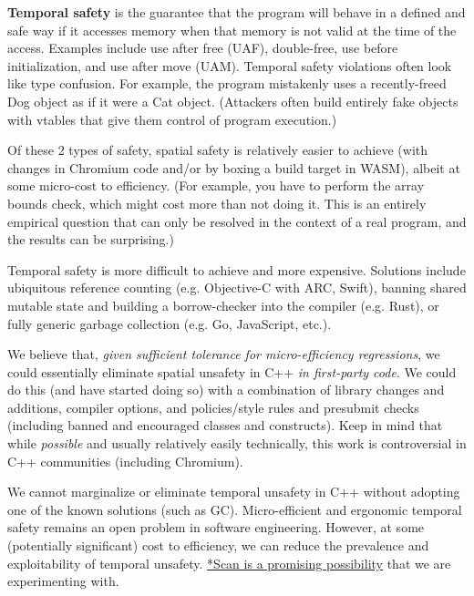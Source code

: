 \documentclass[a4paper,12pt,notitlepage,twoside,openright]{article}
\begin{document}
\textbf{Temporal safety} is the guarantee that the program will behave
in a defined and safe way if it accesses memory when that memory is not
valid at the time of the access. Examples include use after free (UAF),
double-free, use before initialization, and use after move (UAM).
Temporal safety violations often look like type confusion. For example,
the program mistakenly uses a recently-freed Dog object as if it were
a Cat object. (Attackers often build entirely fake objects with vtables
that give them control of program execution.)

Of these 2 types of safety, spatial safety is relatively easier to
achieve (with changes in Chromium code and/or by boxing a build target
in WASM), albeit at some micro-cost to efficiency. (For example, you
have to perform the array bounds check, which might cost more than not
doing it. This is an entirely empirical question that can only be
resolved in the context of a real program, and the results can be
surprising.)

Temporal safety is more difficult to achieve and more expensive.
Solutions include ubiquitous reference counting (e.g. Objective-C with
ARC, Swift), banning shared mutable state and building a borrow-checker
into the compiler (e.g. Rust), or fully generic garbage collection (e.g.
Go, JavaScript, etc.).

We believe that, \emph{given sufficient tolerance for micro-efficiency
regressions}, we could essentially eliminate spatial unsafety in
C++ \emph{in first-party code}. We could do this (and have started doing
so) with a combination of library changes and additions, compiler
options, and policies/style rules and presubmit checks (including banned
and encouraged classes and constructs). Keep in mind that
while \emph{possible} and usually relatively easily technically, this
work is controversial in C++ communities (including Chromium).

We cannot marginalize or eliminate temporal unsafety in C++ without
adopting one of the known solutions (such as GC). Micro-efficient and
ergonomic temporal safety remains an open problem in software
engineering. However, at some (potentially significant) cost to
efficiency, we can reduce the prevalence and exploitability of temporal
unsafety. \href{https://www.google.com/url?q=https://source.chromium.org/chromium/chromium/src/\%2B/master:base/allocator/partition_allocator/starscan/README.md\&sa=D\&source=editors\&ust=1631944129023000\&usg=AOvVaw0WV-iMbo0WDC3QbBfHcu9Z}{*Scan
is a promising possibility} that we are experimenting with.
\end{document}
